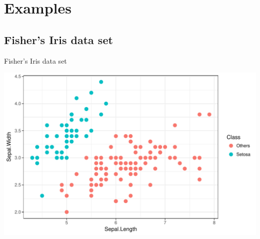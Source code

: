 \documentclass{beamer}\usepackage[]{graphicx}\usepackage[]{color}
\makeatletter
\def\maxwidth{ %
  \ifdim\Gin@nat@width>\linewidth
    \linewidth
  \else
    \Gin@nat@width
  \fi
}
\newenvironment{knitrout}{}{} %
\makeatother
\begin{document}
\ifstandalone
  \section{Examples}
\fi

\subsection*{Fisher's Iris data set}

\begin{frame}[fragile]{Fisher's Iris data set}
\begin{knitrout}\small
{}\color{fgcolor}

{\centering \includegraphics[width=\maxwidth]{figure/data_iris-1} 

}



\end{knitrout}
\end{frame}
\end{document}

